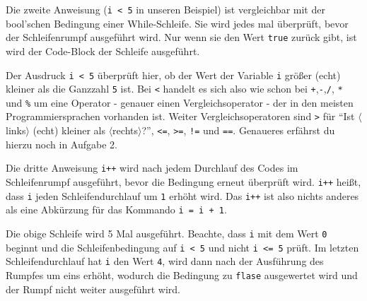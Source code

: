 \begin{Infobox}
	Die zweite Anweisung (\lstinline{i < 5} in unseren Beispiel) ist vergleichbar mit der bool'schen Bedingung einer While-Schleife.
	Sie wird jedes mal überprüft, bevor der Schleifenrumpf ausgeführt wird.
	Nur wenn sie den Wert \lstinline{true} zurück gibt, ist wird der Code-Block der Schleife ausgeführt.\newline

	Der Ausdruck \lstinline{i < 5} überprüft hier, ob der Wert der Variable \texttt{i} größer (echt) kleiner als die Ganzzahl \texttt{5} ist.
	Bei \texttt{<} handelt es sich also wie schon bei \texttt{+},\texttt{-},\texttt{/}, \texttt{*} und \texttt{\%} um eine Operator - genauer einen Vergleichsoperator - der in den meisten Programmiersprachen vorhanden ist.
	Weiter Vergleichsoperatoren sind \texttt{>} für \enquote{Ist $\langle$links$\rangle$ (echt) kleiner als $\langle$rechts$\rangle$?}, \texttt{<=}, \texttt{>=}, \texttt{!=} und \texttt{==}.
	Genaueres erfährst du hierzu noch in Aufgabe 2.\newline

	Die dritte Anweisung \lstinline{i++} wird nach jedem Durchlauf des Codes im Schleifenrumpf ausgeführt, bevor die Bedingung erneut überprüft wird.
	\lstinline{i++} heißt, dass \lstinline{i} jeden Schleifendurchlauf um \lstinline{1} erhöht wird.
	Das \lstinline{i++} ist also nichts anderes als eine Abkürzung für das Kommando \lstinline{i = i + 1}.\newline

	Die obige Schleife wird 5 Mal ausgeführt.
	Beachte, dass \lstinline{i} mit dem Wert \lstinline{0} beginnt und die Schleifenbedingung auf \lstinline{i < 5} und nicht \lstinline{i <= 5} prüft.
	Im letzten Schleifendurchlauf hat \lstinline{i} den Wert \lstinline{4}, wird dann nach der Ausführung des Rumpfes um eins erhöht, wodurch die Bedingung zu \lstinline{flase} ausgewertet wird und der Rumpf nicht weiter ausgeführt wird.
\end{Infobox}


